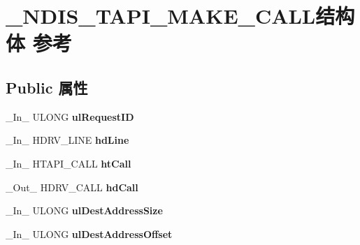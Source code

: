 \hypertarget{struct___n_d_i_s___t_a_p_i___m_a_k_e___c_a_l_l}{}\section{\+\_\+\+N\+D\+I\+S\+\_\+\+T\+A\+P\+I\+\_\+\+M\+A\+K\+E\+\_\+\+C\+A\+L\+L结构体 参考}
\label{struct___n_d_i_s___t_a_p_i___m_a_k_e___c_a_l_l}
\subsection*{Public 属性}
\begin{DoxyCompactItemize}
\item 
\mbox{\label{struct___n_d_i_s___t_a_p_i___m_a_k_e___c_a_l_l_a688357c0def1b3ab2d9d5a3a3513f435}} 
\+\_\+\+In\+\_\+ U\+L\+O\+NG {\bfseries ul\+Request\+ID}
\item 
\mbox{\label{struct___n_d_i_s___t_a_p_i___m_a_k_e___c_a_l_l_a5785263e0211111fcca2a78d4257f9bf}} 
\+\_\+\+In\+\_\+ H\+D\+R\+V\+\_\+\+L\+I\+NE {\bfseries hd\+Line}
\item 
\mbox{\label{struct___n_d_i_s___t_a_p_i___m_a_k_e___c_a_l_l_abd456c53652ebd8b2d2023e7089820c2}} 
\+\_\+\+In\+\_\+ H\+T\+A\+P\+I\+\_\+\+C\+A\+LL {\bfseries ht\+Call}
\item 
\mbox{\label{struct___n_d_i_s___t_a_p_i___m_a_k_e___c_a_l_l_a2e62fb9260b7c30e275c418d76f6831f}} 
\+\_\+\+Out\+\_\+ H\+D\+R\+V\+\_\+\+C\+A\+LL {\bfseries hd\+Call}
\item 
\mbox{\label{struct___n_d_i_s___t_a_p_i___m_a_k_e___c_a_l_l_aca3453db8a6e0007eb239133dd71e488}} 
\+\_\+\+In\+\_\+ U\+L\+O\+NG {\bfseries ul\+Dest\+Address\+Size}
\item 
\mbox{\label{struct___n_d_i_s___t_a_p_i___m_a_k_e___c_a_l_l_afaadbc3c766679da5c029dfa39aeda84}} 
\+\_\+\+In\+\_\+ U\+L\+O\+NG {\bfseries ul\+Dest\+Address\+Offset}
\item 

\end{DoxyCompactItemize}
